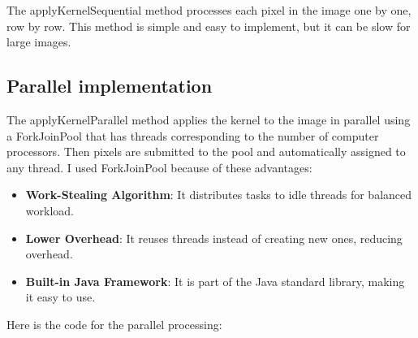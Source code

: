 \documentclass{article}
\begin{document}
\begin{multicols}{2}
    The applyKernelSequential method processes each pixel in the image one by one, row by row. This method is simple and easy to implement, but it can be slow for large images.

    \subsection{Parallel implementation}

    The applyKernelParallel method applies the kernel to the image in parallel using a ForkJoinPool that has threads corresponding to the number of computer processors. Then pixels are submitted to the pool and automatically assigned to any thread. I used ForkJoinPool because of these advantages:
    \cite{gallardo2014java}

    \begin{itemize}
        \item \textbf{Work-Stealing Algorithm}: It  distributes tasks to idle threads for balanced workload.
        \item \textbf{Lower Overhead}: It reuses threads instead of creating new ones, reducing overhead.
        \item \textbf{Built-in Java Framework}: It is part of the Java standard library, making it easy to use.
    \end{itemize}


    \newblock

    Here is the code for the parallel processing:


\end{multicols}
\end{document}
